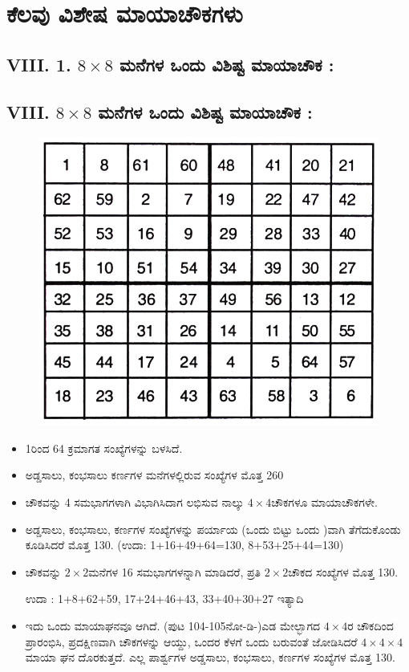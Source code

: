 \chapter{ಕೆಲವು ವಿಶೇಷ ಮಾಯಾಚೌಕಗಳು}

\section*{VIII. 1. $8 \times 8$ ಮನೆಗಳ ಒಂದು ವಿಶಿಷ್ಟ ಮಾಯಾಚೌಕ :}

\section*{VIII. $8 \times 8$ ಮನೆಗಳ ಒಂದು ವಿಶಿಷ್ಟ ಮಾಯಾಚೌಕ :}
\begin{figure}[H]
\includegraphics{src/figures/chap7/fig7.1.jpg}
\end{figure}

\begin{itemize}
	\item 1ರಿಂದ 64 ಕ್ರಮಾಗತ ಸಂಖ್ಯೆಗಳನ್ನು ಬಳಸಿದೆ.
	\item ಅಡ್ಡಸಾಲು, ಕಂಭಸಾಲು ಕರ್ಣಗಳ ಮನೆಗಳಲ್ಲಿರುವ ಸಂಖ್ಯೆಗಳ ಮೊತ್ತ 260
	\item ಚೌಕವನ್ನು 4 ಸಮಭಾಗಗಳಾಗಿ ವಿಭಾಗಿಸಿದಾಗ ಲಭಿಸುವ ನಾಲ್ಕು $4 \times 4$ಚೌಕಗಳೂ ಮಾಯಾಚೌಕಗಳೇ.
	\item ಅಡ್ಡಸಾಲು, ಕಂಭಸಾಲು, ಕರ್ಣಗಳ ಸಂಖ್ಯೆಗಳನ್ನು ಪರ್ಯಾಯ (ಒಂದು ಬಿಟ್ಟು ಒಂದು )ವಾಗಿ ತೆಗೆದುಕೊಂಡು ಕೂಡಿಸಿದರೆ ಮೊತ್ತ 130. (ಉದಾ: 1+16+49+64=130, 8+53+25+44=130)
	\item ಚೌಕವನ್ನು $2 \times 2$ಮನೆಗಳ 16 ಸಮಭಾಗಗಳನ್ನಾಗಿ ಮಾಡಿದರೆ, ಪ್ರತಿ $2 \times 2$ಚೌಕದ ಸಂಖ್ಯೆಗಳ ಮೊತ್ತ 130.

	ಉದಾ : 1+8+62+59, 17+24+46+43, 33+40+30+27 ಇತ್ಯಾದಿ
	\item ಇದು ಒಂದು ಮಾಯಾಘನವೂ ಆಗಿದೆ. (ಪುಟ 104-105ನೋ-ಡಿ-)ಎಡ ಮೇಲ್ಭಾಗದ $4 \times 4$ರ ಚೌಕದಿಂದ ಪ್ರಾರಂಭಿಸಿ, ಪ್ರದಕ್ಷಿಣವಾಗಿ ಚೌಕಗಳನ್ನು ಆಯ್ದು, ಒಂದರ ಕೆಳಗೆ ಒಂದು ಬರುವಂತೆ ಜೋಡಿಸಿದರೆ $4 \times 4 \times 4$ ಮಾಯಾ ಘನ ದೊರಕುತ್ತದೆ. ಎಲ್ಲ ಪಾರ್ಶ್ವಗಳ ಅಡ್ಡಸಾಲು, ಕಂಭಸಾಲು, ಕರ್ಣಗಳ ಸಂಖ್ಯೆಗಳ ಮೊತ್ತ 130.
\end{itemize}


